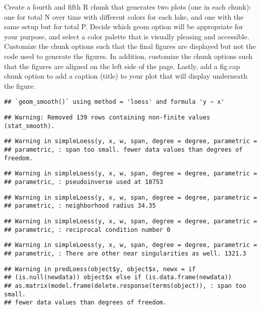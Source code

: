 \documentclass[]{article}
\begin{document}
Create a fourth and fifth R chunk that generates two plots (one in each
chunk): one for total N over time with different colors for each lake,
and one with the same setup but for total P. Decide which geom option
will be appropriate for your purpose, and select a color palette that is
visually pleasing and accessible. Customize the chunk options such that
the final figures are displayed but not the code used to generate the
figures. In addition, customize the chunk options such that the figures
are aligned on the left side of the page. Lastly, add a fig.cap chunk
option to add a caption (title) to your plot that will display
underneath the figure.

\begin{verbatim}
## `geom_smooth()` using method = 'loess' and formula 'y ~ x'
\end{verbatim}

\begin{verbatim}
## Warning: Removed 139 rows containing non-finite values (stat_smooth).
\end{verbatim}

\begin{verbatim}
## Warning in simpleLoess(y, x, w, span, degree = degree, parametric =
## parametric, : span too small. fewer data values than degrees of freedom.
\end{verbatim}

\begin{verbatim}
## Warning in simpleLoess(y, x, w, span, degree = degree, parametric =
## parametric, : pseudoinverse used at 10753
\end{verbatim}

\begin{verbatim}
## Warning in simpleLoess(y, x, w, span, degree = degree, parametric =
## parametric, : neighborhood radius 34.35
\end{verbatim}

\begin{verbatim}
## Warning in simpleLoess(y, x, w, span, degree = degree, parametric =
## parametric, : reciprocal condition number 0
\end{verbatim}

\begin{verbatim}
## Warning in simpleLoess(y, x, w, span, degree = degree, parametric =
## parametric, : There are other near singularities as well. 1321.3
\end{verbatim}

\begin{verbatim}
## Warning in predLoess(object$y, object$x, newx = if
## (is.null(newdata)) object$x else if (is.data.frame(newdata))
## as.matrix(model.frame(delete.response(terms(object)), : span too small.
## fewer data values than degrees of freedom.
\end{verbatim}
\end{document}
